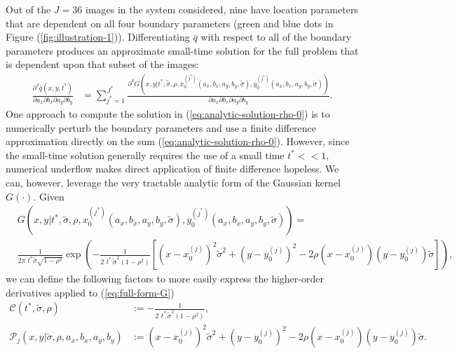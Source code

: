 \documentclass[10pt]{article}
\begin{document}
Out of the $J=36$ images in the system considered, nine have location
parameters that are dependent on all four boundary parameters (green
and blue dots in Figure (\ref{fig:illustration-1})). Differentiating
$\bar{q}$ with respect to all of the boundary parameters produces an
approximate small-time solution for the full problem that is dependent
upon that subset of the images:
\begin{align}
  \frac{\partial^4 \bar{q}(x, y, t^{*})}{\partial a_x
  \partial b_x \partial a_y \partial b_y} &= \sum_{j^*=1}^{J^*} \frac{\partial^4
                                            G(x,y|t^{*}, \tilde{\sigma}, \rho, x_0^{(j^*)}(a_x, b_x, a_y, b_y, \tilde{\sigma}),
                                            y_0^{(j^*)}(a_x, b_x, a_y, b_y, \tilde{\sigma}))} {\partial a_x \partial b_x
                                            \partial a_y \partial b_y}. \label{eq:analytic-solution-rho-0}
\end{align}
One approach to compute the solution in
(\ref{eq:analytic-solution-rho-0}) is to numerically perturb the
boundary parameters and use a finite difference approximation directly
on the sum (\ref{eq:analytic-solution-rho-0}). However, since the
small-time solution generally requires the use of a small time
$t^* << 1$, numerical underflow makes direct application of finite
difference hopeless. We can, however, leverage the very tractable
analytic form of the Gaussian kernel $G(\cdot)$. Given
\begin{align}
  & G(x,y | t^{*}, \tilde{\sigma}, \rho, x_0^{(j^*)}(a_x, b_x, a_y, b_y, \tilde{\sigma}),
    y_0^{(j^*)}(a_x, b_x, a_y, b_y, \tilde{\sigma})) = &  \nonumber \\
  & \frac{1}{2\pi\,\, t^{*}\tilde{\sigma}\sqrt{1-\rho^2}} \exp\left( -\frac{1}{2\,\,t^*\, \tilde{\sigma}^2 (1-\rho^2)} \left[ \left(x-x_0^{(j)}\right)^2 \tilde{\sigma}^2 + \left(y-y_0^{(j)}\right)^2 - 2\rho(x-x_0^{(j)})(y-y_0^{(j)})\tilde{\sigma} \right]\right), & \label{eq:full-form-G}
\end{align}
we can define the following factors to more easily express the
higher-order derivatives applied to (\ref{eq:full-form-G})
\begin{align}                
  \mathcal{C}(t^*, \tilde{\sigma}, \rho) &:= -\frac{1}{2\,\,t^*\, \tilde{\sigma}^2 (1-\rho^2)}, \\
  \mathcal{P}_j(x,y | \tilde{\sigma}, \rho, a_x,b_x,a_y,b_y) &:= \left(x-x_0^{(j)}\right)^2 \tilde{\sigma}^2 + \left(y-y_0^{(j)}\right)^2 - 2\rho(x-x_0^{(j)})(y-y_0^{(j)})\tilde{\sigma}.
\end{align}
\end{document}
